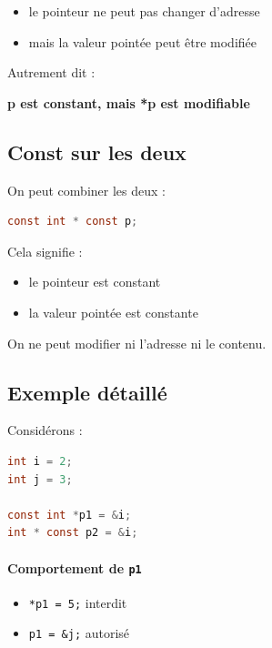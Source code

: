 \begin{itemize}
    \item le pointeur ne peut pas changer d’adresse
    \item mais la valeur pointée peut être modifiée
\end{itemize}

Autrement dit :

\begin{center}
\textbf{p est constant, mais *p est modifiable}
\end{center}

\subsection{Const sur les deux}

On peut combiner les deux :

\begin{lstlisting}[language=C]
const int * const p;
\end{lstlisting}

Cela signifie :

\begin{itemize}
    \item le pointeur est constant
    \item la valeur pointée est constante
\end{itemize}

On ne peut modifier ni l’adresse ni le contenu.

\subsection{Exemple détaillé}

Considérons :

\begin{lstlisting}[language=C]
int i = 2;
int j = 3;

const int *p1 = &i;
int * const p2 = &i;
\end{lstlisting}

\paragraph{Comportement de \texttt{p1}}

\begin{itemize}
    \item \texttt{*p1 = 5;} \hspace{1em} interdit
    \item \texttt{p1 = \&j;} \hspace{1.3em} autorisé
\end{itemize}

